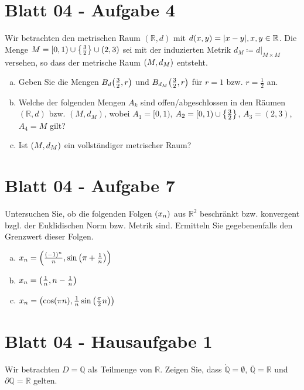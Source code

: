 \documentclass{scrreprt}
\begin{document}
\section{Blatt 04 - Aufgabe 4}

Wir betrachten den metrischen Raum $(\mathbb{R}, d)$ mit $d(x, y) = \abs{x - y}, x, y \in \mathbb{R}$.
Die Menge $M = [0, 1) \cup \qty{\frac{3}{2}} \cup(2, 3)$ sei mit der induzierten Metrik
$d_M \coloneqq d|_{M \times M}$ versehen, so dass der metrische Raum $\qty(M, d_M)$ entsteht.

\begin{enumerate}[a)]
\item Geben Sie die Mengen $B_d\qty(\frac{3}{2}, r)$ und $B_{d_M}\qty(\frac{3}{2}, r)$
  für $r = 1$ bzw. $r = \frac{1}{2}$ an.

\item Welche der folgenden Mengen $A_k$ sind offen/abgeschlossen in den Räumen $(\mathbb{R}, d)$
  bzw. $(M, d_M)$, wobei $A_1 = [0, 1)$, $A_2 = [0, 1) \cup \qty{\frac{3}{2}}$, $A_3 = (2, 3)$,
  $A_4 = M$ gilt?

\item Ist $\qty(M, d_M)$ ein vollständiger metrischer Raum?
\end{enumerate}

\section{Blatt 04 - Aufgabe 7}

Untersuchen Sie, ob die folgenden Folgen $\qty(x_n)$ aus $\mathbb{R}^2$
beschränkt bzw. konvergent bzgl. der Euklidischen Norm bzw. Metrik sind.
Ermitteln Sie gegebenenfalls den Grenzwert dieser Folgen.
\begin{enumerate}[a)]
\item $x_n = \qty(\frac{(-1)^n}{n}, \sin\qty(\pi + \frac{1}{n}))$
\item $x_n = \qty(\frac{1}{n}, n - \frac{1}{n})$
\item $x_n = \qty(\cos(\pi n), \frac{1}{n} \sin\qty(\frac{\pi}{2}n))$
\end{enumerate}

\section{Blatt 04 - Hausaufgabe 1}

Wir betrachten $D = \mathbb{Q}$ als Teilmenge von $\mathbb{R}$.
Zeigen Sie, dass $\mathring{\mathbb{Q}} = \emptyset$, $\overline{\mathbb{Q}} = \mathbb{R}$
und $\partial \mathbb{Q} = \mathbb{R}$ gelten.
\end{document}
